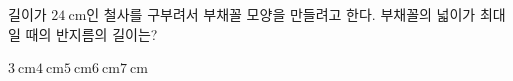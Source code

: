 길이가 $24\ \mathrm{cm}$인 철사를 구부려서 부채꼴 모양을 만들려고 한다. 부채꼴의 넓이가 최대일 때의 반지름의 길이는? 
\begin{choices32}{$3\ \mathrm{cm}$}{$4\ \mathrm{cm}$}{$5\ \mathrm{cm}$}{$6\ \mathrm{cm}$}{$7\ \mathrm{cm}$}\end{choices32}
